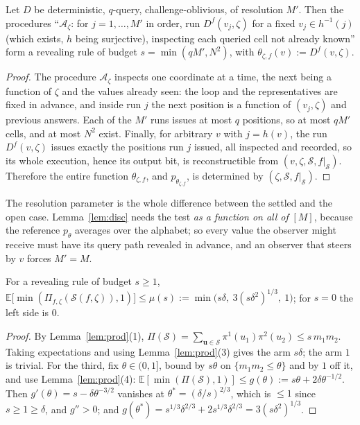 \documentclass{aicr-solution}
\newcommand{\Exp}{\mathbb{E}}
\newcommand{\vu}{\mathbf{u}}
\begin{document}
\begin{lemma}\label{lem:rr}
Let $D$ be deterministic, $q$-query, challenge-oblivious, of resolution $M'$.
Then the procedures ``$\mathcal A_\zeta$: for $j=1,\dots,M'$ in order, run
$D^{f}(v_j,\zeta)$ for a fixed $v_j\in h^{-1}(j)$ (which exists, $h$ being
surjective), inspecting each queried cell not already known'' form a revealing
rule of budget $s=\min(qM',N^{2})$, with $\theta_{\zeta,f}(v):=D^{f}(v,\zeta)$.
\end{lemma}

\begin{proof}
The procedure $\mathcal A_\zeta$ inspects one coordinate at a time, the next being a function
of $\zeta$ and the values already seen: the loop and the representatives are
fixed in advance, and inside run $j$ the next position is a function of
$(v_j,\zeta)$ and previous answers. Each of the $M'$ runs issues at most $q$
positions, so at most $qM'$ cells, and at most $N^{2}$ exist. Finally, for
arbitrary $v$ with $j=h(v)$, the run $D^{f}(v,\zeta)$ issues exactly the
positions run $j$ issued, all inspected and recorded, so its whole execution,
hence its output bit, is reconstructible from
$(v,\zeta,\mathcal S,f|_{\mathcal S})$. Therefore the entire function
$\theta_{\zeta,f}$, and $p_{\theta_{\zeta,f}}$, is determined by
$(\zeta,\mathcal S,f|_{\mathcal S})$.
\end{proof}

The resolution parameter is the whole difference between the settled and the open
case. Lemma~\ref{lem:disc} needs the test \emph{as a function on all of} $[M]$,
because the reference $p_\theta$ averages over the alphabet; so every value the
observer might receive must have its query path revealed in advance, and an
observer that steers by $v$ forces $M'=M$.

\begin{lemma}\label{lem:mass}
For a revealing rule of budget $s\ge1$,
$\Exp\bigl[\min(\Pi_{f,\zeta}(\mathcal S(f,\zeta)),1)\bigr]\le
\mu(s):=\min\bigl(s\delta,\ 3(s\delta^{2})^{1/3},\ 1\bigr)$; for $s=0$ the left
side is $0$.
\end{lemma}

\begin{proof}
By Lemma~\ref{lem:prod}(1),
$\Pi(\mathcal S)=\sum_{\vu\in\mathcal S}\pi^1(u_1)\pi^2(u_2)\le s\,m_1m_2$.
Taking expectations and using Lemma~\ref{lem:prod}(3) gives the arm $s\delta$;
the arm $1$ is trivial. For the third, fix $\theta\in(0,1]$, bound by $s\theta$ on
$\{m_1m_2\le\theta\}$ and by $1$ off it, and use Lemma~\ref{lem:prod}(4):
$\Exp[\min(\Pi(\mathcal S),1)]\le g(\theta):=s\theta+2\delta\theta^{-1/2}$. Then
$g'(\theta)=s-\delta\theta^{-3/2}$ vanishes at $\theta^{*}=(\delta/s)^{2/3}$,
which is $\le1$ since $s\ge1\ge\delta$, and $g''>0$; and
$g(\theta^{*})=s^{1/3}\delta^{2/3}+2s^{1/3}\delta^{2/3}=3(s\delta^{2})^{1/3}$.
\end{proof}
\end{document}
